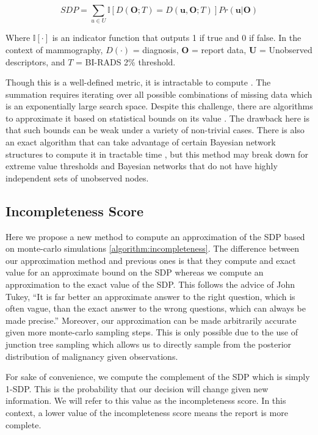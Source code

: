 {\huge\[
SDP = \sum_{u \in U}\mathbb{I}\left[D(\mathbf{O};T) = D(\mathbf{u},\mathbf{O};T)\right]Pr(\mathbf{u}|\mathbf{O})
\]}

Where $\mathbb{I}[\cdotp]$ is an indicator function that outputs 1 if true and 0 if false. 
In the context of mammography, $D(\cdotp)$ = diagnosis, $\mathbf{O}$ = report data, $\mathbf{U}$ = Unobserved descriptors, and $T$ = BI-RADS 2\% threshold.

Though this is a well-defined metric, it is intractable to compute \cite{Chen:2013tw}. The summation requires iterating over all possible combinations of missing data which is an exponentially large search space. Despite this challenge, there are algorithms to approximate it based on statistical bounds on its value \cite{Choi:2012id}. The drawback here is that such bounds can be weak under a variety of non-trivial cases. There is also an exact algorithm that can take advantage of certain Bayesian network structures to compute it in tractable time \cite{Chen:2013tw}, but this method may break down for extreme value thresholds and Bayesian networks that do not have highly independent sets of unobserved nodes.

\subsection{Incompleteness Score}
Here we propose a new method to compute an approximation of the SDP based on monte-carlo simulations \ref{algorithm:incompleteness}. The difference between our approximation method and previous ones\cite{Choi:2012id} is that they compute and exact value for an approximate bound on the SDP whereas we compute an approximation to the exact value of the SDP. This follows the advice of John Tukey, “It is far better an approximate answer to the right question, which is often vague, than the exact answer to the wrong questions, which can always be made precise.” \cite{Tukey:1962vw} Moreover, our approximation can be made arbitrarily accurate given more monte-carlo sampling steps. This is only possible due to the use of junction tree sampling which allows us to directly sample from the posterior distribution of malignancy given observations.

For sake of convenience, we compute the complement of the SDP which is simply 1-SDP. This is the probability that our decision will change given new information. We will refer to this value as the incompleteness score. In this context, a lower value of the incompleteness score means the report is more complete.


